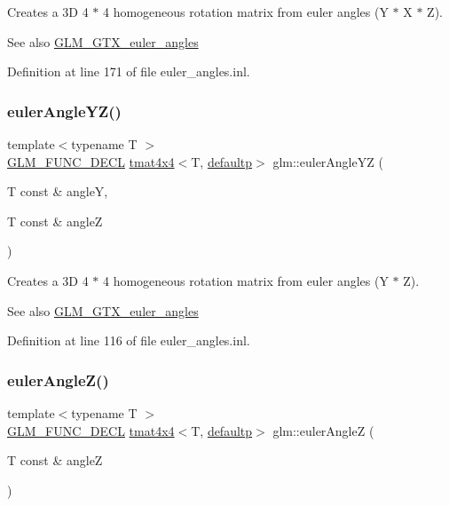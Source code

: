 Creates a 3D 4 $\ast$ 4 homogeneous rotation matrix from euler angles (Y $\ast$ X $\ast$ Z). \begin{DoxySeeAlso}{See also}
\mbox{\hyperlink{group__gtx__euler__angles}{G\+L\+M\+\_\+\+G\+T\+X\+\_\+euler\+\_\+angles}} 
\end{DoxySeeAlso}


Definition at line 171 of file euler\+\_\+angles.\+inl.

\mbox{\label{group__gtx__euler__angles_ga1033f84f51d61646145352ef0c1bb58c}} 
\subsubsection{\texorpdfstring{eulerAngleYZ()}{eulerAngleYZ()}}
{\footnotesize\ttfamily template$<$typename T $>$ \\
\mbox{\hyperlink{setup_8hpp_ab2d052de21a70539923e9bcbf6e83a51}{G\+L\+M\+\_\+\+F\+U\+N\+C\+\_\+\+D\+E\+CL}} \mbox{\hyperlink{structglm_1_1tmat4x4}{tmat4x4}}$<$T, \mbox{\hyperlink{namespaceglm_a0f04f086094c747d227af4425893f545a9d21ccd8b5a009ec7eb7677befc3bf51}{defaultp}}$>$ glm\+::euler\+Angle\+YZ (\begin{DoxyParamCaption}\item[{T const \&}]{angleY,  }\item[{T const \&}]{angleZ }\end{DoxyParamCaption})}

Creates a 3D 4 $\ast$ 4 homogeneous rotation matrix from euler angles (Y $\ast$ Z). \begin{DoxySeeAlso}{See also}
\mbox{\hyperlink{group__gtx__euler__angles}{G\+L\+M\+\_\+\+G\+T\+X\+\_\+euler\+\_\+angles}} 
\end{DoxySeeAlso}


Definition at line 116 of file euler\+\_\+angles.\+inl.

\mbox{\label{group__gtx__euler__angles_gab59c4fe7f735568255cc19fddd3ddfcd}} 
\subsubsection{\texorpdfstring{eulerAngleZ()}{eulerAngleZ()}}
{\footnotesize\ttfamily template$<$typename T $>$ \\
\mbox{\hyperlink{setup_8hpp_ab2d052de21a70539923e9bcbf6e83a51}{G\+L\+M\+\_\+\+F\+U\+N\+C\+\_\+\+D\+E\+CL}} \mbox{\hyperlink{structglm_1_1tmat4x4}{tmat4x4}}$<$T, \mbox{\hyperlink{namespaceglm_a0f04f086094c747d227af4425893f545a9d21ccd8b5a009ec7eb7677befc3bf51}{defaultp}}$>$ glm\+::euler\+AngleZ (\begin{DoxyParamCaption}\item[{T const \&}]{angleZ }\end{DoxyParamCaption})}

